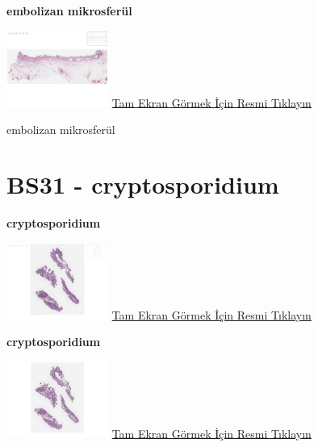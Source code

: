 \documentclass[
  letterpaper,
  DIV=11,
  numbers=noendperiod]{scrreprt}
\begin{document}
\textbf{embolizan mikrosferül}

\href{https://images.patolojiatlasi.com/BS30/HE.html}{\includegraphics[width=0.25\textwidth,height=\textheight]{./screenshots/thumbnail_BS30-HE.png}}
\href{https://images.patolojiatlasi.com/BS30/HE.html}{Tam Ekran Görmek
İçin Resmi Tıklayın}

\begin{tcolorbox}[enhanced jigsaw, breakable, opacitybacktitle=0.6, arc=.35mm, colbacktitle=quarto-callout-tip-color!10!white, colback=white, toptitle=1mm, left=2mm, opacityback=0, colframe=quarto-callout-tip-color-frame, titlerule=0mm, rightrule=.15mm, bottomrule=.15mm, toprule=.15mm, bottomtitle=1mm, title=\textcolor{quarto-callout-tip-color}{\faLightbulb}\hspace{0.5em}{Tanı}, coltitle=black, leftrule=.75mm]

embolizan mikrosferül

\end{tcolorbox}

\hypertarget{sec-BS31}{%
\section{BS31 - cryptosporidium}\label{sec-BS31}}

\textbf{cryptosporidium}

\href{https://images.patolojiatlasi.com/BS31/HE1.html}{\includegraphics[width=0.25\textwidth,height=\textheight]{./screenshots/thumbnail_BS31-HE1.png}}
\href{https://images.patolojiatlasi.com/BS31/HE1.html}{Tam Ekran Görmek
İçin Resmi Tıklayın}

\textbf{cryptosporidium}

\href{https://images.patolojiatlasi.com/BS31/HE2.html}{\includegraphics[width=0.25\textwidth,height=\textheight]{./screenshots/thumbnail_BS31-HE2.png}}
\href{https://images.patolojiatlasi.com/BS31/HE2.html}{Tam Ekran Görmek
İçin Resmi Tıklayın}
\end{document}

